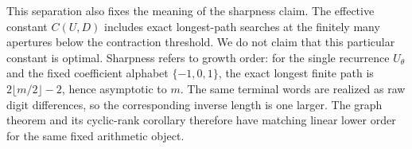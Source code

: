 This separation also fixes the meaning of the sharpness claim.  The
effective constant $C(U,D)$ includes exact longest-path searches at the
finitely many apertures below the contraction threshold.  We do not claim
that this particular constant is optimal.  Sharpness refers to growth order:
for the single recurrence $U_\theta$ and the fixed coefficient alphabet
$\{-1,0,1\}$, the exact longest finite path is
$2\lfloor m/2\rfloor-2$, hence asymptotic to $m$.  The same terminal words
are realized as raw digit differences, so the corresponding inverse length
is one larger.  The graph theorem and its cyclic-rank corollary therefore
have matching linear lower order for the same fixed arithmetic object.
